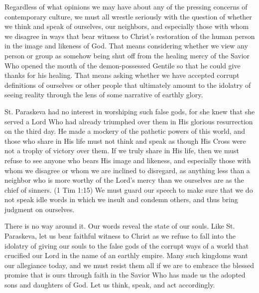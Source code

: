 \documentclass[twoside, letterpaper, 12pt]{report}
\begin{document}
\begin{maybetwocolumns}
Regardless of what opinions we may have about any of the pressing concerns of contemporary culture,
we must all wrestle seriously with the question of whether we think and speak of ourselves, our
neighbors, and especially those with whom we disagree in ways that bear witness to Christ’s
restoration of the human person in the image and likeness of God. That means considering whether we
view any person or group as somehow being shut off from the healing mercy of the Savior Who opened
the mouth of the demon-possessed Gentile so that he could give thanks for his healing. That means
asking whether we have accepted corrupt definitions of ourselves or other people that ultimately
amount to the idolatry of seeing reality through the lens of some narrative of earthly glory.

St. Paraskeva had no interest in worshiping such false gods, for she knew that she served a Lord Who
had already triumphed over them in His glorious resurrection on the third day. He made a mockery of
the pathetic powers of this world, and those who share in His life must not think and speak as
though His Cross were not a trophy of victory over them. If we truly share in His life, then we
must refuse to see anyone who bears His image and likeness, and especially those with whom we
disagree or whom we are inclined to disregard, as anything less than a neighbor who is more worthy
of the Lord’s mercy than we ourselves are as the chief of sinners. (1 Tim 1:15) We must guard
our speech to make sure that we do not speak idle words in which we insult and condemn others, and
thus bring judgment on ourselves.

There is no way around it. Our words reveal the state of our souls. Like St. Paraskeva, let us
bear faithful witness to Christ as we refuse to fall into the idolatry of giving our souls to the
false gods of the corrupt ways of a world that crucified our Lord in the name of an earthly empire.
Many such kingdoms want our allegiance today, and we must resist them all if we are to embrace the
blessed promise that is ours through faith in the Savior Who has made us the adopted sons and
daughters of God. Let us think, speak, and act accordingly.
\end{maybetwocolumns}



\readerline{\throughtheprayers}

\end{document}
